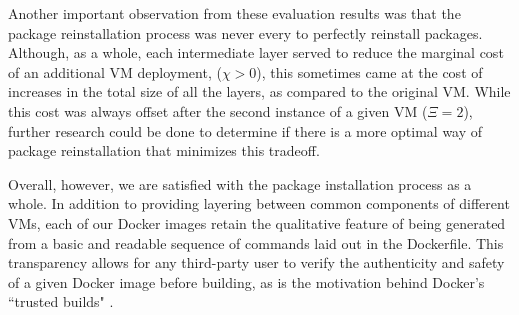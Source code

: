 Another important observation from these evaluation results was that the package reinstallation process was never every to perfectly reinstall packages. Although, as a whole, each intermediate layer served to reduce the marginal cost of an additional VM deployment, ($\chi > 0$), this sometimes came at the cost of increases in the total size of all the layers, as compared to the original VM. While this cost was always offset after the second instance of a given VM ($\Xi = 2$), further research could be done to determine if there is a more optimal way of package reinstallation that minimizes this tradeoff. 

Overall, however, we are satisfied with the package installation process as a whole. In addition to providing layering between common components of different VMs, each of our Docker images retain the qualitative feature of being generated from a basic and readable sequence of commands laid out in the Dockerfile. This transparency allows for any third-party user to verify the authenticity and safety of a given Docker image before building, as is the motivation behind Docker's ``trusted builds" \cite{trustedbuilds}.



